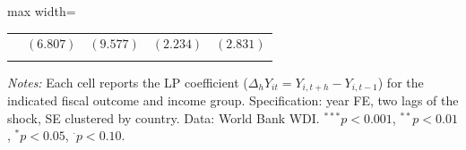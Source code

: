 \begin{table}[htbp]
\begin{adjustbox}{max width=\textwidth}
\begin{threeparttable}
\begin{tabular}{lrrrr}
& $(6.807)$ & $(9.577)$ & $(2.234)$ & $(2.831)$ \\[2pt]
\addlinespace
\bottomrule
\end{tabular}
\begin{tablenotes}\small
\item \textit{Notes:} Each cell reports the LP coefficient ($\Delta_h Y_{it} = Y_{i,t+h} - Y_{i,t-1}$) for the indicated fiscal outcome and income group. Specification: year FE, two lags of the shock, SE clustered by country. Data: World Bank WDI. $^{***}p<0.001$, $^{**}p<0.01$, $^{*}p<0.05$, $^{\cdot}p<0.10$.
\end{tablenotes}
\end{threeparttable}
\end{adjustbox}
\end{table}
